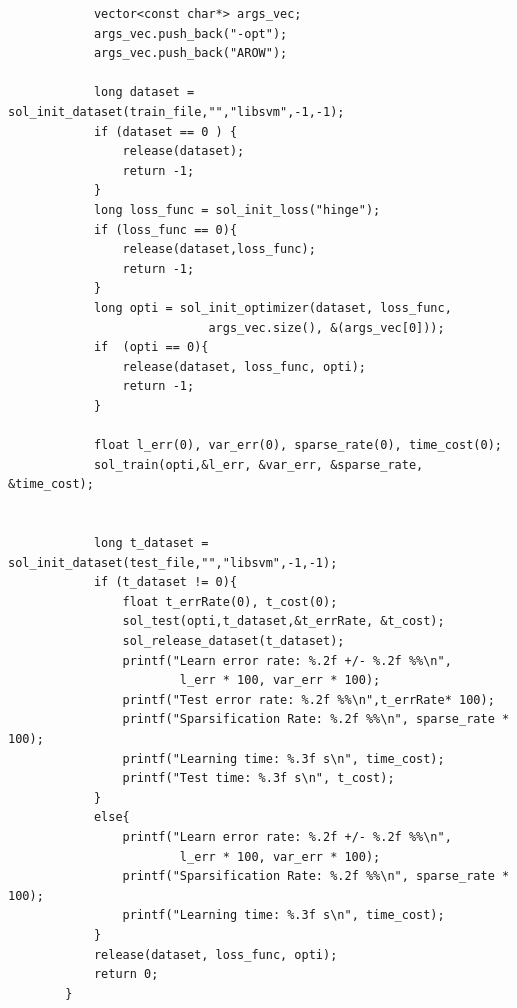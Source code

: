 \documentclass[11pt,a4paper]{article}
\begin{document}
\begin{enumerate}
\begin{lstlisting}
            vector<const char*> args_vec;
            args_vec.push_back("-opt");
            args_vec.push_back("AROW");

            long dataset = sol_init_dataset(train_file,"","libsvm",-1,-1);
            if (dataset == 0 ) {
                release(dataset);
                return -1;
            }
            long loss_func = sol_init_loss("hinge");
            if (loss_func == 0){
                release(dataset,loss_func);
                return -1;
            }
            long opti = sol_init_optimizer(dataset, loss_func,
                            args_vec.size(), &(args_vec[0]));
            if  (opti == 0){
                release(dataset, loss_func, opti);
                return -1;
            }

            float l_err(0), var_err(0), sparse_rate(0), time_cost(0);
            sol_train(opti,&l_err, &var_err, &sparse_rate, &time_cost);


            long t_dataset = sol_init_dataset(test_file,"","libsvm",-1,-1);
            if (t_dataset != 0){
                float t_errRate(0), t_cost(0);
                sol_test(opti,t_dataset,&t_errRate, &t_cost);
                sol_release_dataset(t_dataset);
                printf("Learn error rate: %.2f +/- %.2f %%\n",
                        l_err * 100, var_err * 100);
                printf("Test error rate: %.2f %%\n",t_errRate* 100); 
                printf("Sparsification Rate: %.2f %%\n", sparse_rate * 100);
                printf("Learning time: %.3f s\n", time_cost);
                printf("Test time: %.3f s\n", t_cost);
            }
            else{
                printf("Learn error rate: %.2f +/- %.2f %%\n",
                        l_err * 100, var_err * 100);
                printf("Sparsification Rate: %.2f %%\n", sparse_rate * 100);
                printf("Learning time: %.3f s\n", time_cost);
            }
            release(dataset, loss_func, opti);
            return 0;
        }

        \end{lstlisting}
\end{enumerate}
\end{document}
